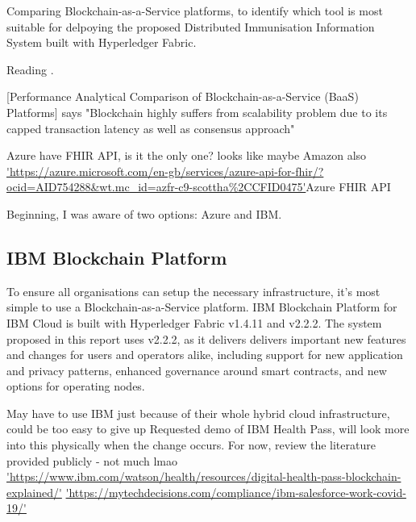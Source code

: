 Comparing Blockchain-as-a-Service platforms, to identify which tool is most suitable for delpoying the proposed Distributed Immunisation Information System built with Hyperledger Fabric.\linebreak[1]

Reading \cite{onik_performance_2019}.\linebreak[1]

[Performance Analytical Comparison of Blockchain-as-a-Service (BaaS) Platforms] says "Blockchain highly suffers from scalability problem due to its capped transaction
latency as well as consensus approach"\linebreak[1]

Azure have FHIR API, is it the only one? looks like maybe Amazon also \url{'https://azure.microsoft.com/en-gb/services/azure-api-for-fhir/?ocid=AID754288&wt.mc_id=azfr-c9-scottha%2CCFID0475'}{Azure FHIR API}
\linebreak[1]

Beginning, I was aware of two options: Azure and IBM.\linebreak[1]

\subsection{IBM Blockchain Platform}
To ensure all organisations can setup the necessary infrastructure, it's most simple to use a Blockchain-as-a-Service platform. 
IBM Blockchain Platform for IBM Cloud is built with Hyperledger Fabric v1.4.11 and v2.2.2. The system proposed in this report uses v2.2.2, as it delivers delivers important new features and changes for users and operators alike, including support for new application and privacy patterns, enhanced governance around smart contracts, and new options for operating nodes. \cite{noauthor_whats_nodate}

May have to use IBM just because of their whole hybrid cloud infrastructure, could be too easy to give up \cite{noauthor_ibm_2020}
\linebreak[1]
Requested demo of IBM Health Pass, will look more into this physically when the change occurs. For now, review the literature provided publicly - not much lmao \url{'https://www.ibm.com/watson/health/resources/digital-health-pass-blockchain-explained/'}
\url{'https://mytechdecisions.com/compliance/ibm-salesforce-work-covid-19/'}
